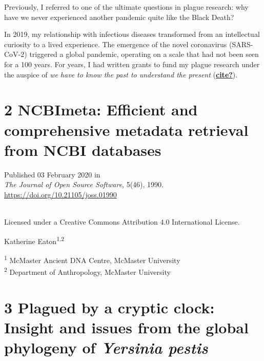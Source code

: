 \documentclass[
]{report}
\begin{document}
Previously, I referred to one of the ultimate questions in plague
research: why have we never experienced another pandemic quite like the
Black Death?

In 2019, my relationship with infectious diseases transformed from an
intellectual curiosity to a lived experience. The emergence of the novel
coronavirus (SARS-CoV-2) triggered a global pandemic, operating on a
scale that had not been seen for a 100 years. For years, I had written
grants to fund my plague research under the auspice of \emph{we have to
know the past to understand the present}
(\protect\hyperlink{ref-cite}{\textbf{cite?}}).

\hypertarget{ncbimeta-efficient-and-comprehensive-metadata-retrieval-from-ncbi-databases}{%
\chapter{2 NCBImeta: Efficient and comprehensive metadata retrieval from
NCBI
databases}\label{ncbimeta-efficient-and-comprehensive-metadata-retrieval-from-ncbi-databases}}

\setlength{\parindent}{0em}

Published 03 February 2020 in\\
\emph{The Journal of Open Source Software}, 5(46), 1990.\\
\url{https://doi.org/10.21105/joss.01990}\strut \\
Licensed under a Creative Commons Attribution 4.0 International
License.\\
\hspace*{0.333em}

Katherine Eaton\textsuperscript{1,2}\\
\hspace*{0.333em}

\textsuperscript{1} McMaster Ancient DNA Centre, McMaster University\\
\textsuperscript{2} Department of Anthropology, McMaster University

\setlength{\parindent}{2em}

\hypertarget{plagued-by-a-cryptic-clock-insight-and-issues-from-the-global-phylogeny-of-yersinia-pestis}{%
\chapter{\texorpdfstring{3 Plagued by a cryptic clock: Insight and
issues from the global phylogeny of \emph{Yersinia
pestis}}{3 Plagued by a cryptic clock: Insight and issues from the global phylogeny of Yersinia pestis}}\label{plagued-by-a-cryptic-clock-insight-and-issues-from-the-global-phylogeny-of-yersinia-pestis}}
\end{document}
